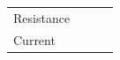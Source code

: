 \begin{enumerate}[noitemsep, label=\textbf{\arabic*}. ]
{\begin{tabular}[t]{|l|l|l|l|}
    
        Resistance &
    
    
         &
    
    
         &
    
    
     \tabularnewline\cline{1-1}\cline{2-2}\cline{3-3}\cline{4-4}
    
    
        Current &
    
    
         &
    
    
         &
    
    
     \tabularnewline\cline{1-1}\cline{2-2}\cline{3-3}\cline{4-4}
    

\end{tabular}}
\end{enumerate}
